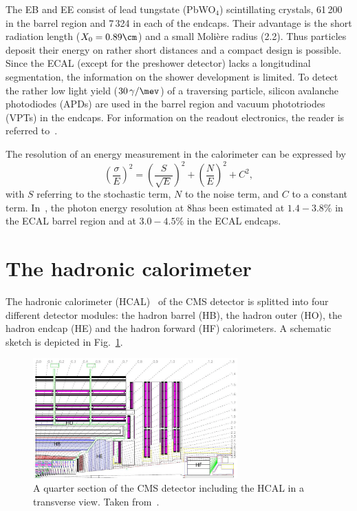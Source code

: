 The EB and EE consist of lead tungstate (PbWO$_4$) scintillating crystals, 61\,200 in the barrel region and 7\,324 in each of the endcaps. 
Their advantage is the short radiation length ($X_0=0.89\cm$) and a small Moli\`ere radius (2.2\cm).
Thus particles deposit their energy on rather short distances and a compact design is possible.
Since the ECAL (except for the preshower detector) lacks a longitudinal segmentation, the information on the shower development is limited.
To detect the rather low light yield ($30\,\gamma/\mev$) of a traversing particle, silicon avalanche photodiodes (APDs) are used in the barrel region and vacuum  phototriodes (VPTs) in the endcaps.
For information on the readout electronics, the reader is referred to~\cite{bib:CMS:TDR_2006}.

The resolution of an energy measurement in the calorimeter can be expressed by 
\begin{equation}
\label{eq:CaloResolution}
\left( \frac{\sigma}{E} \right)^2 = \left( \frac{S}{\sqrt{E}} \right)^2 + \left( \frac{N}{E} \right)^2 +C^2,
\end{equation}
with $S$ referring to the stochastic term, $N$ to the noise term, and $C$ to a constant term.
In~\cite{bib:CMS:PhotonIdentification_8TeV}, the photon energy resolution at 8\tev has been estimated at $1.4-3.8\%$ in the ECAL barrel region and at $3.0-4.5\%$ in the ECAL endcaps.


\section{The hadronic calorimeter}
The hadronic calorimeter (HCAL)~\cite{bib:CMS:TDR_2006,bib:CMS:TDR_HCAL} of the CMS detector is splitted into four different detector modules: the hadron barrel (HB), the hadron outer (HO), the hadron endcap (HE) and the hadron forward (HF) calorimeters.
A schematic sketch is depicted in Fig.~\ref{fig:HCAL}.
\begin{figure}[!b]
  \centering
      \includegraphics[width=0.70\textwidth]{figures/experiment/CMS/fig_HCALdiagram_smaller_size.png}
  \caption{A quarter section of the CMS detector including the HCAL in a transverse view. Taken from~\cite{bib:CMS:experiment}.}  
  \label{fig:HCAL}
\end{figure}

